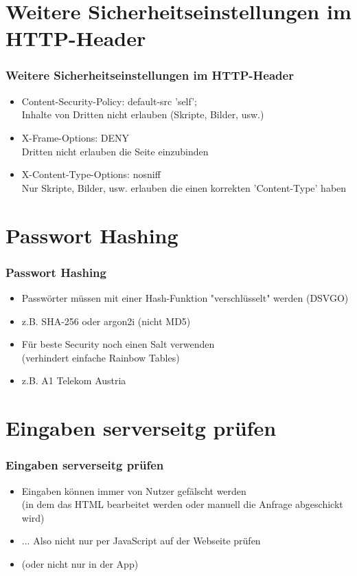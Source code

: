 \documentclass[ngerman2]{beamer}
\begin{document}
\section{Weitere Sicherheitseinstellungen im HTTP-Header}

\begin{frame}[fragile]
\frametitle{Weitere Sicherheitseinstellungen im HTTP-Header}
  \begin{itemize}
		\item Content-Security-Policy: default-src 'self';\\
			Inhalte von Dritten nicht erlauben (Skripte, Bilder, usw.)
		\item X-Frame-Options: DENY\\
			Dritten nicht erlauben die Seite einzubinden
		\item X-Content-Type-Options: nosniff\\
			Nur Skripte, Bilder, usw. erlauben die einen korrekten 'Content-Type' haben
  \end{itemize}
\end{frame}

\section{Passwort Hashing}

\begin{frame}[fragile]
\frametitle{Passwort Hashing}
  \begin{itemize}
		\item Passwörter müssen mit einer Hash-Funktion "verschlüsselt" werden (DSVGO)
		\item z.B. SHA-256 oder argon2i (nicht MD5)
		\item Für beste Security noch einen Salt verwenden\\
      (verhindert einfache Rainbow Tables)
    \item z.B. A1 Telekom Austria
      \cite{a1passwoerter}
  \end{itemize}
\end{frame}

\section{Eingaben serverseitg prüfen}

\begin{frame}[fragile]
\frametitle{Eingaben serverseitg prüfen}
  \begin{itemize}
    \item Eingaben können immer von Nutzer gefälscht werden\\
			(in dem das HTML bearbeitet werden oder manuell die Anfrage abgeschickt wird)
		\item ... Also nicht nur per JavaScript auf der Webseite prüfen
    \item (oder nicht nur in der App)
  \end{itemize}
\end{frame}
\end{document}
